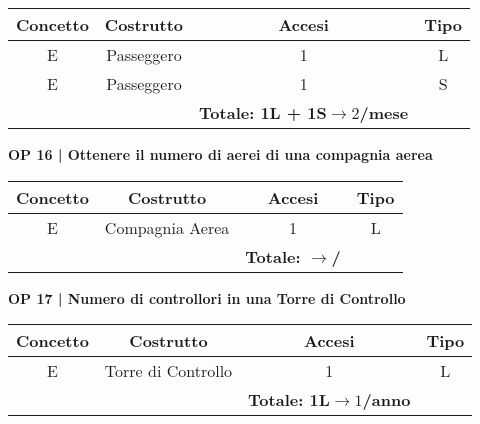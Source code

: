\begin{tabular}{ c c c c}
	\hline
	\textbf{Concetto} & \textbf{Costrutto} & \textbf{Accesi} & \textbf{Tipo}\\
	\hline
	\textsf{\small E} & \textsf{\small Passeggero} & \textsf{\small 1} &  \textsf{\small L}\\
	\hline
	\textsf{\small E} & \textsf{\small Passeggero} & \textsf{\small 1} &  \textsf{\small S}\\ %
	\hline
	\textsf{\small } & \textsf{\small } & \textbf{Totale: 1L + 1S$\rightarrow 2$/mese } \textsf{\small } & \textsf{\small }\\
	\hline
\end{tabular}

\vspace{.6cm}


\textbf{\small OP 16 | Ottenere il numero di aerei di una compagnia aerea}\\

\begin{tabular}{ c c c c}
	\hline
	\textbf{Concetto} & \textbf{Costrutto} & \textbf{Accesi} & \textbf{Tipo}\\
	\hline
	\textsf{\small E} & \textsf{\small Compagnia Aerea} & \textsf{\small 1} &  \textsf{\small L}\\
	\hline
	\textsf{\small } & \textsf{\small } & \textbf{Totale: $\rightarrow $/ } \textsf{\small } & \textsf{\small }\\
	\hline
\end{tabular}

\vspace{.6cm}


\textbf{\small OP 17 | Numero di controllori in una Torre di Controllo}\\

\begin{tabular}{ c c c c}
	\hline
	\textbf{Concetto} & \textbf{Costrutto} & \textbf{Accesi} & \textbf{Tipo}\\
	\hline
	\textsf{\small E} & \textsf{\small Torre di Controllo} & \textsf{\small 1} &  \textsf{\small L}\\
	\hline
	\textsf{\small } & \textsf{\small } & \textbf{Totale: 1L$\rightarrow 1$/anno } \textsf{\small } & \textsf{\small }\\
	\hline
\end{tabular}

